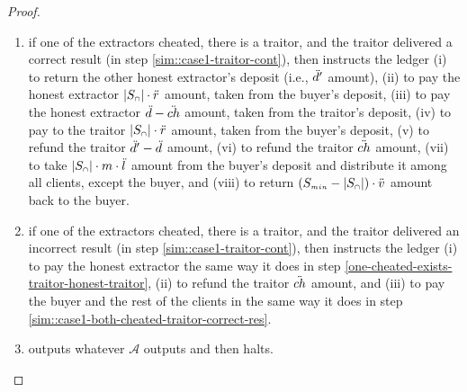 \begin{proof}
\begin{enumerate}
\begin{enumerate}
%
\item if one of the extractors cheated, there is a traitor, and the traitor delivered a correct result (in step \ref{sim::case1-traitor-cont}), then instructs the ledger (i) to return the other honest extractor's deposit (i.e., $\ddot{d}'$ amount), (ii) to pay the honest extractor $|S_{\scriptscriptstyle\cap}|\cdot \ddot{r}$ amount, taken from the buyer's deposit,  (iii) to pay the honest extractor $\ddot{d}- \ddot{ch}$ amount, taken from the traitor's deposit,   (iv) to pay to the traitor $|S_{\scriptscriptstyle\cap}|\cdot \ddot{r}$ amount, taken from the buyer’s deposit,  (v) to refund the traitor $\ddot{d}'-\ddot{d}$ amount, (vi) to refund the traitor $\ddot{ch}$ amount,  (vii) to take $|S_{\scriptscriptstyle\cap}|\cdot m\cdot \ddot{l}$ amount from the buyer's deposit and distribute it among all clients, except the buyer, and (viii) to return $(S_{\scriptscriptstyle min}-|S_{\scriptscriptstyle\cap}|)\cdot \ddot{v}$ amount back  to the buyer. 
%
\item if one of the extractors cheated, there is a traitor, and the traitor delivered an incorrect result (in step \ref{sim::case1-traitor-cont}), then instructs the ledger (i) to pay the honest extractor the same way it does in step \ref{one-cheated-exists-traitor-honest-traitor}, (ii) to refund the traitor  $\ddot{ch}$ amount, and (iii)  to pay the buyer and the rest of the clients in the same way it does in step \ref{sim::case1-both-cheated-traitor-correct-res}.
%
\item outputs whatever $\mathcal{A}$ outputs and then halts.
%
\end{enumerate}
%
\end{enumerate}




\end{proof}
